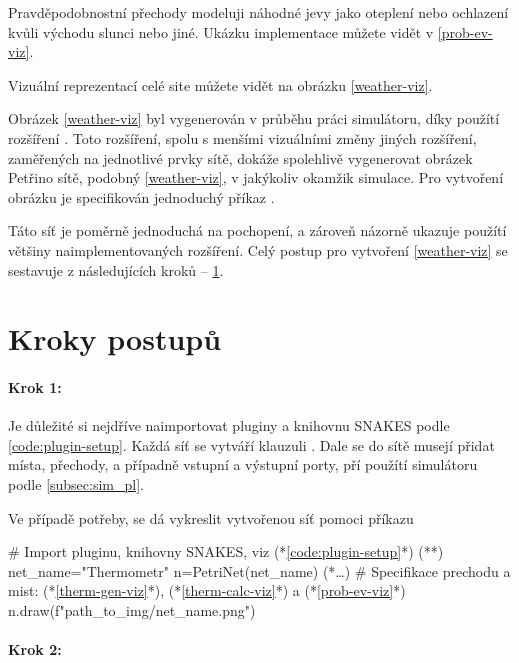 Pravděpodobnostní přechody modeluji náhodné jevy jako oteplení nebo ochlazení kvůli východu slunci nebo jiné. Ukázku implementace můžete vidět v \ref{prob-ev-viz}.

Vizuální reprezentací celé site můžete vidět na obrázku \ref{weather-viz}.

Obrázek \ref{weather-viz} byl vygenerován v průběhu práci simulátoru, díky použítí rozšíření \href{https://www.ibisc.univ-evry.fr/~fpommereau/SNAKES/API/plugins/gv.html}{}. Toto rozšíření, spolu s menšími vizuálními změny jiných rozšíření, zaměřených na jednotlivé prvky sítě, dokáže spolehlivě vygenerovat obrázek Petřino sítě, podobný \ref{weather-viz}, v jakýkoliv okamžik simulace. Pro vytvoření obrázku je specifikován jednoduchý příkaz .


Táto síť je poměrně jednoduchá na pochopení, a zároveň názorně ukazuje použítí většiny naimplementovaných rozšíření. Celý postup pro vytvoření \ref{weather-viz} se sestavuje z následujících kroků -- \ref{sec:process-steps}.

\section{Kroky postupů}
\label{sec:process-steps}

\paragraph{Krok 1:}

Je důležité si nejdříve naimportovat pluginy a knihovnu SNAKES podle \ref{code:plugin-setup}. Každá síť se vytváří klauzuli . Dale se do sítě musejí přidat místa, přechody, a případně vstupní a výstupní porty, pří použítí simulátoru podle \ref{subsec:sim_pl}.

Ve případě potřeby, se dá vykreslit vytvořenou síť pomoci příkazu 

\begin{python}
  # Import pluginu, knihovny SNAKES, viz (*\ref{code:plugin-setup}*) (*\label{code:thermometr-draw}*)
  net_name="Thermometr"
  n=PetriNet(net_name)
  (*\ldots*) # Specifikace prechodu a mist: (*\ref{therm-gen-viz}*), (*\ref{therm-calc-viz}*) a (*\ref{prob-ev-viz}*)
  n.draw(f"{path_to_img}/{net_name}.png")
\end{python}

\paragraph{Krok 2:}

